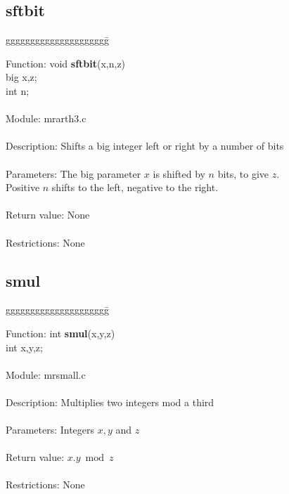\pagebreak
\subsection{sftbit}

\begin{tabbing}
ggggggggggggggggggggg\= \kill

      Function:      \>void {\bf sftbit}(x,n,z) \\
                     \>big x,z; \\
                     \>int n; \\
      \ \\
      Module:        \>mrarth3.c \\
      \ \\
      Description:   \>Shifts a big integer left or right by a number of bits \\
      \ \\
      Parameters:    \>The big parameter $x$ is shifted by $n$ bits, to give $z$. \\
                     \>Positive $n$ shifts to the left, negative to the right. \\
      \ \\
      Return value:  \>None \\
      \ \\
      Restrictions:  \>None \\

\end{tabbing}
\pagebreak
\subsection{smul}

\begin{tabbing}
ggggggggggggggggggggg\= \kill

      Function:      \>int {\bf smul}(x,y,z) \\
                     \>int x,y,z; \\
      \ \\
      Module:        \>mrsmall.c \\
      \ \\
      Description:   \>Multiplies two integers mod a third \\
      \ \\
      Parameters:    \>Integers $x, y$ and $z$ \\
      \ \\
      Return value:  \>$x.y \bmod z$   \\
      \ \\
      Restrictions:  \>None \\

\end{tabbing}

